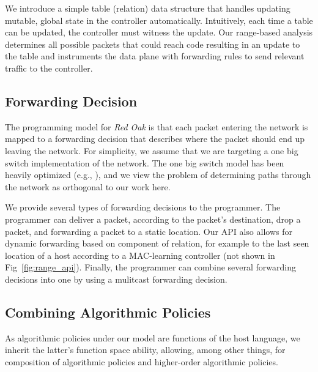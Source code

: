 \documentclass[nocopyrightspace]{sigplanconf}
\begin{document}
	We introduce a simple table (relation) data structure that handles updating mutable, global state in the controller automatically. Intuitively, each time a table can be updated, the controller must witness the update. Our range-based analysis determines all possible packets that could reach code resulting in an update to the table and instruments the data plane with forwarding rules to send relevant traffic to the controller.

   

     
  

   \subsection*{Forwarding Decision}
	The programming model for \textit{Red Oak} is that each packet entering the network is mapped to a forwarding decision that describes where the packet should end up leaving the network. For simplicity, we assume that we are targeting a one big switch implementation of the network. The one big switch model has been heavily optimized (e.g., \cite{Obs}), and we view the problem of determining paths through the network as orthogonal to our work here. 
  
   We provide several types of forwarding decisions to the programmer. The programmer can deliver a packet, according to the packet's destination, drop a packet, and forwarding a packet to a static location. Our API also allows for dynamic forwarding based on component of relation, for example to the last seen location of a host according to a MAC-learning controller (not shown in Fig~\ref{fig:range_api}). Finally, the programmer can combine several forwarding decisions into one by using a mulitcast forwarding decision.
   

   \subsection*{Combining Algorithmic Policies}
   As algorithmic policies under our model are functions of the host language, we inherit the latter's function space ability, allowing, among other things, for composition of algorithmic policies and higher-order algorithmic policies.
\end{document}
